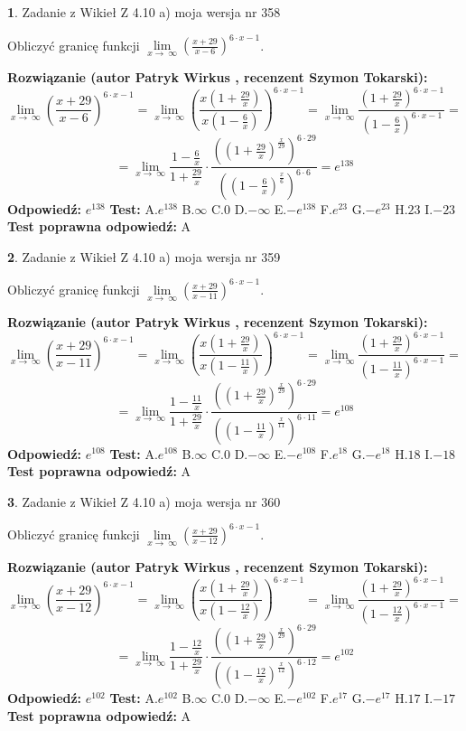 \documentclass[12pt, a4paper]{article}
\theoremstyle{definition} %
\newtheorem{zad}{}
\newcommand{\zadStart}[1]{\begin{zad}#1\newline}
\newcommand{\zadStop}{\end{zad}}
\newcommand{\rozwStart}[2]{\noindent \textbf{Rozwiązanie (autor #1 , recenzent #2): }\newline}
\newcommand{\rozwStop}{\newline}
\newcommand{\odpStart}{\noindent \textbf{Odpowiedź:}\newline}
\newcommand{\odpStop}{\newline}
\newcommand{\testStart}{\noindent \textbf{Test:}\newline}
\newcommand{\testStop}{\newline}
\newcommand{\kluczStart}{\noindent \textbf{Test poprawna odpowiedź:}\newline}
\newcommand{\kluczStop}{\newline}
\begin{document}
\zadStart{Zadanie z Wikieł Z 4.10 a) moja wersja nr 358}

Obliczyć granicę funkcji  $\lim\limits_{x\to\ \infty}(\frac{x+29}{x-6})^{6\cdot x-1}$.
\zadStop
\rozwStart{Patryk Wirkus}{Szymon Tokarski}
$$\lim\limits_{x\to\ \infty}(\frac{x+29}{x-6})^{6\cdot x-1} = \lim\limits_{x\to\ \infty}(\frac{x(1+\frac{29}{x})}{x(1-\frac{6}{x})})^{6\cdot x-1}=\lim\limits_{x\to\ \infty}\frac{(1+\frac{29}{x})^{6\cdot x-1}}{(1-\frac{6}{x})^{6\cdot x-1}}=$$
$$=\lim\limits_{x\to\ \infty}\frac{1-\frac{6}{x}}{1+\frac{29}{x}}\cdot\frac{((1+\frac{29}{x})^{\frac{x}{29}})^{6\cdot29}}{((1-\frac{6}{x})^{\frac{x}{6}})^{6\cdot6}}=e^{138}$$
\rozwStop
\odpStart
$e^{138}$
\odpStop
\testStart
A.$e^{138}$ B.$\infty$ C.$0$ D.$-\infty$ E.$-e^{138}$
F.$e^{23}$ G.$-e^{23}$
H.$23$
I.$-23$
\testStop
\kluczStart
A
\kluczStop



\zadStart{Zadanie z Wikieł Z 4.10 a) moja wersja nr 359}

Obliczyć granicę funkcji  $\lim\limits_{x\to\ \infty}(\frac{x+29}{x-11})^{6\cdot x-1}$.
\zadStop
\rozwStart{Patryk Wirkus}{Szymon Tokarski}
$$\lim\limits_{x\to\ \infty}(\frac{x+29}{x-11})^{6\cdot x-1} = \lim\limits_{x\to\ \infty}(\frac{x(1+\frac{29}{x})}{x(1-\frac{11}{x})})^{6\cdot x-1}=\lim\limits_{x\to\ \infty}\frac{(1+\frac{29}{x})^{6\cdot x-1}}{(1-\frac{11}{x})^{6\cdot x-1}}=$$
$$=\lim\limits_{x\to\ \infty}\frac{1-\frac{11}{x}}{1+\frac{29}{x}}\cdot\frac{((1+\frac{29}{x})^{\frac{x}{29}})^{6\cdot29}}{((1-\frac{11}{x})^{\frac{x}{11}})^{6\cdot11}}=e^{108}$$
\rozwStop
\odpStart
$e^{108}$
\odpStop
\testStart
A.$e^{108}$ B.$\infty$ C.$0$ D.$-\infty$ E.$-e^{108}$
F.$e^{18}$ G.$-e^{18}$
H.$18$
I.$-18$
\testStop
\kluczStart
A
\kluczStop



\zadStart{Zadanie z Wikieł Z 4.10 a) moja wersja nr 360}

Obliczyć granicę funkcji  $\lim\limits_{x\to\ \infty}(\frac{x+29}{x-12})^{6\cdot x-1}$.
\zadStop
\rozwStart{Patryk Wirkus}{Szymon Tokarski}
$$\lim\limits_{x\to\ \infty}(\frac{x+29}{x-12})^{6\cdot x-1} = \lim\limits_{x\to\ \infty}(\frac{x(1+\frac{29}{x})}{x(1-\frac{12}{x})})^{6\cdot x-1}=\lim\limits_{x\to\ \infty}\frac{(1+\frac{29}{x})^{6\cdot x-1}}{(1-\frac{12}{x})^{6\cdot x-1}}=$$
$$=\lim\limits_{x\to\ \infty}\frac{1-\frac{12}{x}}{1+\frac{29}{x}}\cdot\frac{((1+\frac{29}{x})^{\frac{x}{29}})^{6\cdot29}}{((1-\frac{12}{x})^{\frac{x}{12}})^{6\cdot12}}=e^{102}$$
\rozwStop
\odpStart
$e^{102}$
\odpStop
\testStart
A.$e^{102}$ B.$\infty$ C.$0$ D.$-\infty$ E.$-e^{102}$
F.$e^{17}$ G.$-e^{17}$
H.$17$
I.$-17$
\testStop
\kluczStart
A
\kluczStop
\end{document}

